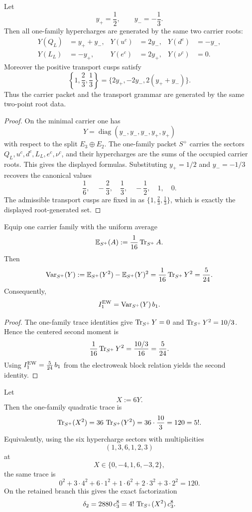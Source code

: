 \begin{proposition}
\label{prop:dual-root-generation}
Let
\[
y_+=\frac12,
\qquad
y_-=-\frac13.
\]
Then all one-family hypercharges are generated by the same two carrier roots:
\[
\begin{aligned}
Y(Q_L)&=y_++y_-,
&
Y(u^c)&=2y_-,
&
Y(d^c)&=-y_-,
\\
Y(L_L)&=-y_+,
&
Y(e^c)&=2y_+,
&
Y(\nu^c)&=0.
\end{aligned}
\]
Moreover the positive transport cusps satisfy
\[
\left\{1,\frac23,\frac13\right\}=\{2y_+,-2y_-,2(y_++y_-)\}.
\]
Thus the carrier packet and the transport grammar are generated by the same two-point root data.
\end{proposition}

\begin{proof}
On the minimal carrier one has
\[
Y=\operatorname{diag}(y_-,y_-,y_-,y_+,y_+)
\]
with respect to the split $E_3\oplus E_2$. The one-family packet $S^+$ carries the sectors
$Q_L,u^c,d^c,L_L,e^c,\nu^c$, and their hypercharges are the sums of the occupied carrier roots.
This gives the displayed formulas. Substituting $y_+=1/2$ and $y_-=-1/3$ recovers the canonical
values
\[
\frac16,\quad
-\frac23,\quad
\frac13,\quad
-\frac12,\quad
1,\quad
0.
\]
The admissible transport cusps are fixed in  as
$\{1,\frac23,\frac13\}$, which is exactly the displayed root-generated set.
\end{proof}

\begin{corollary}
Equip one carrier family with the uniform average
\[
\mathbb E_{S^+}(A):=\frac{1}{16}\operatorname{Tr}_{S^+}A.
\]
Then
\[
\operatorname{Var}_{S^+}(Y)
:=
\mathbb E_{S^+}(Y^2)-\mathbb E_{S^+}(Y)^2
=
\frac{1}{16}\operatorname{Tr}_{S^+}Y^2
=
\frac{5}{24}.
\]
Consequently,
\[
I_1^{\mathrm{EW}}=\operatorname{Var}_{S^+}(Y)\,b_1.
\]
\end{corollary}

\begin{proof}
The one-family trace identities give $\operatorname{Tr}_{S^+}Y=0$ and $\operatorname{Tr}_{S^+}Y^2=10/3$. Hence the centered second moment is
\[
\frac{1}{16}\operatorname{Tr}_{S^+}Y^2=\frac{10/3}{16}=\frac{5}{24}.
\]
Using $I_1^{\mathrm{EW}}=\frac{5}{24}\,b_1$ from the electroweak block relation yields the second identity.
\end{proof}

\begin{corollary}
\label{cor:factorial-trace-delta2}
Let
\[
X:=6Y.
\]
Then the one-family quadratic trace is
\[
\operatorname{Tr}_{S^+}(X^2)
=
36\,\operatorname{Tr}_{S^+}(Y^2)
=
36\cdot\frac{10}{3}
=
120
=
5!.
\]
Equivalently, using the six hypercharge sectors with multiplicities
\[
(1,3,6,1,2,3)
\]
at
\[
X\in\{0,-4,1,6,-3,2\},
\]
the same trace is
\[
0^2+3\cdot 4^2+6\cdot 1^2+1\cdot 6^2+2\cdot 3^2+3\cdot 2^2=120.
\]
On the retained branch this gives the exact factorization
\[
\delta_2
=
2880\,c_3^8
=
4!\,\operatorname{Tr}_{S^+}(X^2)\,c_3^8.
\]
\end{corollary}

